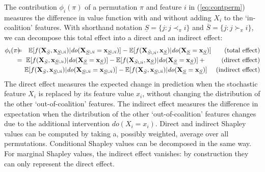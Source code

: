 \documentclass{article}
\newcommand{\vX}{\mathbf{X}}
\newcommand{\vx}{\mathbf{x}}
\newcommand{\expectation}{\mathbb{E}}
\newcommand{\contribution}{{\phi}}
\newcommand{\val}{{v}}
\newcommand{\dodo}{\mathit{do}}
\newcommand{\ldo}[1]{\dodo(X_{#1} = x_{#1})}
\newcommand{\lvdo}[1]{\dodo(\vX_{#1} = \vx_{#1})}
\newcommand{\perm}{\pi}
\newcommand{\isequal}{\hspace*{-2.5mm} & = & \hspace*{-2.5mm}}
\newcommand{\Spre}{\underline{S}}
\newcommand{\Spost}{\bar{S}}
\begin{document}
The contribution $\contribution_i(\perm)$ of a permutation $\perm$ and feature $i$ in (\ref{eq:contperm}) measures the difference in value function with and without adding $X_i$ to the `in-coalition' features.
With shorthand notation $\Spre = \{j: j \prec_\perm i\}$ and $\Spost = \{j: j \succ_\perm i\}$, we can decompose this total effect into a direct and an indirect effect:
\begin{eqnarray*}
	\contribution_i(\perm) \isequal
	\expectation[f(\vX_{\Spost},\vx_{\Spre \cup i})|\lvdo{\Spre \cup i}] - \expectation[f(\vX_{\Spost \cup i},\vx_{\Spre})|\lvdo{\Spre}] ~~~~~~\mbox{(total effect)} \\
	\isequal \expectation[f(\vX_{\Spost},\vx_{\Spre \cup i})|\lvdo{\Spre}] - \expectation[f(\vX_{\Spost \cup i},\vx_{\Spre})|\lvdo{\Spre}] + ~~~~~~~\mbox{(direct effect)} \\
	&& \! \! \! \! \expectation[f(\vX_{\Spost},\vx_{\Spre \cup i})|\lvdo{\Spre \cup i}] - \expectation[f(\vX_{\Spost},\vx_{\Spre \cup i})|\lvdo{\Spre}] ~~~~\mbox{(indirect effect)}
\end{eqnarray*}
The direct effect measures the expected change in prediction when the stochastic feature $X_i$ is replaced by its feature value $x_i$, without changing the distribution of the other `out-of-coalition' features. The indirect effect measures the difference in expectation when the distribution of the other `out-of-coalition' features changes due to the additional intervention $\ldo{i}$. Direct and indirect Shapley values can be computed by taking a, possibly weighted, average over all permutations. Conditional Shapley values can be decomposed in the same way. For marginal Shapley values, the indirect effect vanishes: by construction they can only represent the direct effect.

\newcommand{\patd}{{\em D}}
\newcommand{\pats}{{\em E}}
\newcommand{\pata}{{\em R}}
\end{document}
